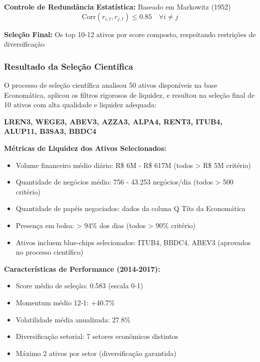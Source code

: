 \textbf{Controle de Redundância Estatística:} Baseado em Markowitz (1952)
\begin{equation}
\text{Corr}(r_{i,t}, r_{j,t}) \leq 0.85 \quad \forall i \neq j
\end{equation}

\textbf{Seleção Final:} Os top 10-12 ativos por score composto, respeitando restrições de diversificação

\subsubsection{Resultado da Seleção Científica}

O processo de seleção científica analisou 50 ativos disponíveis na base Economática, aplicou os filtros rigorosos de liquidez, e resultou na seleção final de 10 ativos com alta qualidade e liquidez adequada:

\begin{center}
\textbf{LREN3, WEGE3, ABEV3, AZZA3, ALPA4, RENT3, ITUB4, ALUP11, B3SA3, BBDC4}
\end{center}

\textbf{Métricas de Liquidez dos Ativos Selecionados:}
\begin{itemize}
    \item Volume financeiro médio diário: R\$ 6M - R\$ 617M (todos > R\$ 5M critério)
    \item Quantidade de negócios médio: 756 - 43.253 negócios/dia (todos > 500 critério)
    \item Quantidade de papéis negociados: dados da coluna Q Títs da Economática
    \item Presença em bolsa: > 94\% dos dias (todos > 90\% critério)
    \item Ativos incluem blue-chips selecionados: ITUB4, BBDC4, ABEV3 (aprovados no processo científico)
\end{itemize}

\textbf{Características de Performance (2014-2017):}
\begin{itemize}
    \item Score médio de seleção: 0.583 (escala 0-1)
    \item Momentum médio 12-1: +40.7\%
    \item Volatilidade média anualizada: 27.8\%
    \item Diversificação setorial: 7 setores econômicos distintos
    \item Máximo 2 ativos por setor (diversificação garantida)
\end{itemize}

